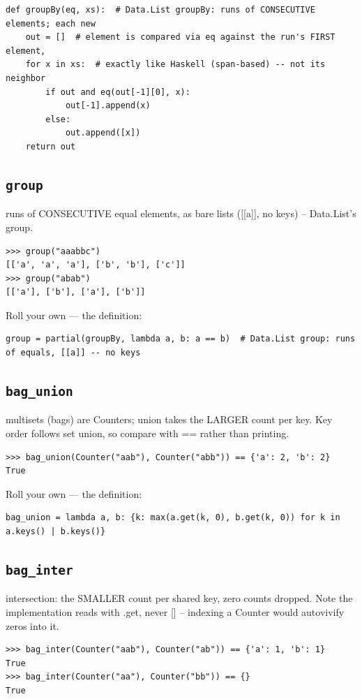 \documentclass[10pt,letterpaper]{book}
\begin{document}
\begin{lstlisting}[style=ex]
def groupBy(eq, xs):  # Data.List groupBy: runs of CONSECUTIVE elements; each new
    out = []  # element is compared via eq against the run's FIRST element,
    for x in xs:  # exactly like Haskell (span-based) -- not its neighbor
        if out and eq(out[-1][0], x):
            out[-1].append(x)
        else:
            out.append([x])
    return out
\end{lstlisting}

\subsection{\texttt{group}}\label{def:group}
runs of CONSECUTIVE equal elements, as bare lists ([[a]], no keys) -- Data.List's group.
\begin{lstlisting}[style=ex]
>>> group("aaabbc")
[['a', 'a', 'a'], ['b', 'b'], ['c']]
>>> group("abab")
[['a'], ['b'], ['a'], ['b']]
\end{lstlisting}

Roll your own --- the definition:

\begin{lstlisting}[style=ex]
group = partial(groupBy, lambda a, b: a == b)  # Data.List group: runs of equals, [[a]] -- no keys
\end{lstlisting}

\subsection{\texttt{bag\_union}}\label{def:bag-union}
multisets (bags) are Counters; union takes the LARGER count per key. Key order follows set union, so compare with == rather than printing.
\begin{lstlisting}[style=ex]
>>> bag_union(Counter("aab"), Counter("abb")) == {'a': 2, 'b': 2}
True
\end{lstlisting}

Roll your own --- the definition:

\begin{lstlisting}[style=ex]
bag_union = lambda a, b: {k: max(a.get(k, 0), b.get(k, 0)) for k in a.keys() | b.keys()}
\end{lstlisting}
\subsection{\texttt{bag\_inter}}\label{def:bag-inter}
intersection: the SMALLER count per shared key, zero counts dropped. Note the implementation reads with .get, never [] -- indexing a Counter would autovivify zeros into it.
\begin{lstlisting}[style=ex]
>>> bag_inter(Counter("aab"), Counter("ab")) == {'a': 1, 'b': 1}
True
>>> bag_inter(Counter("aa"), Counter("bb")) == {}
True
\end{lstlisting}
\end{document}
